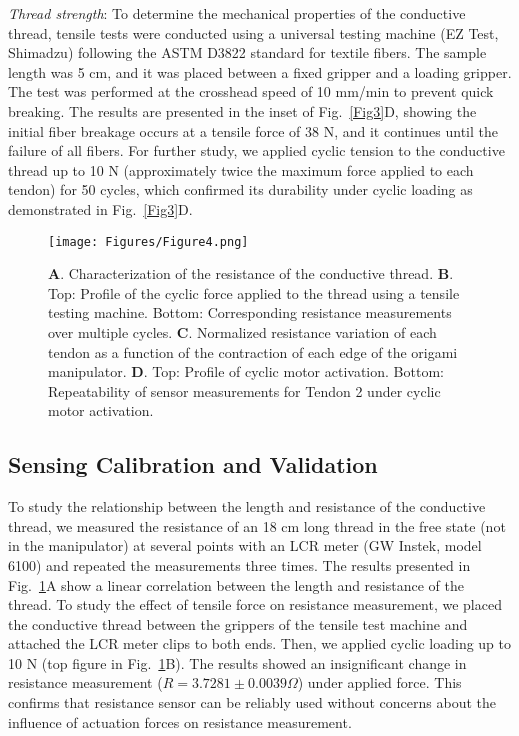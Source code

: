 \documentclass[journal, letterpaper]{IEEEtran}
\begin{document}
\textit{Thread strength}:
To determine the mechanical properties of the conductive thread, tensile tests were conducted using a universal testing machine (EZ Test, Shimadzu) following the ASTM D3822 standard for textile fibers. The sample length was 5 cm, and it was placed between a fixed gripper and a loading gripper. The test was performed at the crosshead speed of 10 mm/min to prevent quick breaking. The results are presented in the inset of Fig.~\ref{Fig3}D, showing the initial fiber breakage occurs at a tensile force of 38 N, and it continues until the failure of all fibers.
For further study, we applied cyclic tension to the conductive thread up to 10 N (approximately twice the maximum force applied to each tendon) for 50 cycles, which confirmed its durability under cyclic loading as demonstrated in Fig.~\ref{Fig3}D. 

\begin{figure}[h]
\centering
\texttt{[image: Figures/Figure4.png]}
\caption{\textbf{A}. Characterization of the resistance of the conductive thread. \textbf{B}. Top: Profile of the cyclic force applied to the thread using a tensile testing machine. Bottom: Corresponding resistance measurements over multiple cycles. \textbf{C}. Normalized resistance variation of each tendon as a function of the contraction of each edge of the origami manipulator.  \textbf{D}. Top: Profile of cyclic motor activation. Bottom: Repeatability of sensor measurements for Tendon 2 under cyclic motor activation.}
\label{Fig4}
\end{figure}

\subsection{Sensing Calibration and Validation}
To study the relationship between the length and resistance of the conductive thread, we measured the resistance of an 18 cm long thread in the free state (not in the manipulator) at several points with an LCR meter (GW Instek, model 6100) and repeated the measurements three times. The results presented in Fig.~\ref{Fig4}A show a linear correlation between the length and resistance of the thread. 
To study the effect of tensile force on resistance measurement, we placed the conductive thread between the grippers of the tensile test machine and attached the LCR meter clips to both ends. Then, we applied cyclic loading up to 10 N (top figure in Fig.~\ref{Fig4}B). The results showed an insignificant change in resistance measurement ($ R=3.7281\pm 0.0039 \Omega $) under applied force. This confirms that resistance sensor can be reliably used without concerns about the influence of actuation forces on resistance measurement.  
\end{document}
